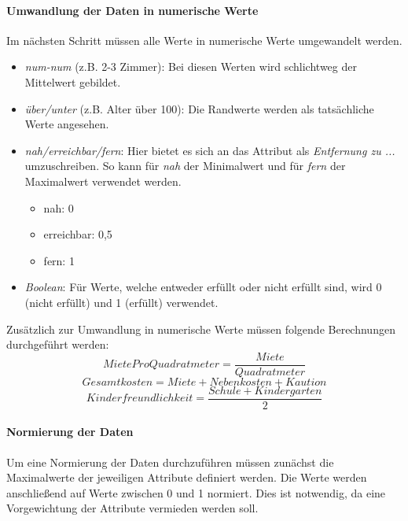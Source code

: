 \paragraph{Umwandlung der Daten in numerische Werte}
Im nächsten Schritt müssen alle Werte in numerische Werte umgewandelt werden.
\begin{itemize}
    \item \textit{num-num} (z.B. 2-3 Zimmer):  Bei diesen Werten wird schlichtweg der Mittelwert gebildet.
    \item \textit{über/unter} (z.B. Alter über 100): Die Randwerte werden als tatsächliche Werte angesehen.
    \item \textit{nah/erreichbar/fern}: Hier bietet es sich an das Attribut als \textit{Entfernung zu ...} umzuschreiben.
                So kann für \textit{nah} der Minimalwert und für \textit{fern} der Maximalwert verwendet werden.
    \begin{itemize}
        \item nah: 0
        \item erreichbar: 0,5
        \item fern: 1
    \end{itemize}
    \item \textit{Boolean}: Für Werte, welche entweder erfüllt oder nicht erfüllt sind, wird 0 (nicht erfüllt) und 1 (erfüllt) verwendet.
\end{itemize}

Zusätzlich zur Umwandlung in numerische Werte müssen folgende Berechnungen durchgeführt werden:
\begin{equation}
        MieteProQuadratmeter = \frac{Miete}{Quadratmeter}
\end{equation}
\begin{equation}
    Gesamtkosten = Miete + Nebenkosten + Kaution
\end{equation}
\begin{equation}
    Kinderfreundlichkeit = \frac{Schule + Kindergarten}{2}
\end{equation}

\paragraph{Normierung der Daten}
Um eine Normierung der Daten durchzuführen müssen zunächst die Maximalwerte der
jeweiligen Attribute definiert werden. Die Werte werden anschließend auf Werte
zwischen 0 und 1 normiert. Dies ist notwendig, da eine Vorgewichtung der Attribute
vermieden werden soll.


